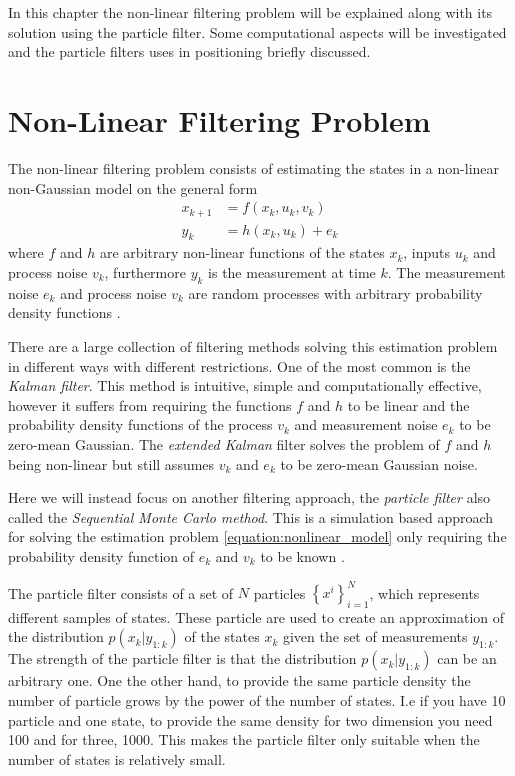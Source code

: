 \documentclass{LTHthesis}
\begin{document}
In this chapter the non-linear filtering problem will be explained along with its solution using the particle filter. Some computational aspects will be investigated and the particle filters uses in positioning briefly discussed.
%
\section{Non-Linear Filtering Problem}
The non-linear filtering problem consists of estimating the states in a non-linear non-Gaussian model on the general form
%
\begin{subequations}
\label{equation:nonlinear_model}
\begin{align}
x_{k+1} &= f(x_k,u_k,v_k) \label{equation:nonlinear_model_first}\\
y_k&=h(x_k,u_k) + e_k
\label{equation:nonlinear_model_second}
\end{align}
\end{subequations} 
%
where $f$ and $h$ are arbitrary non-linear functions of the states $x_k$, inputs $u_k$ and process noise $v_k$, furthermore $y_k$ is the measurement at time $k$. The measurement noise $e_k$ and process noise $v_k$ are random processes with arbitrary probability density functions \cite{gson12}. 

There are a large collection of filtering methods solving this estimation problem in different ways with different restrictions. One of the most common is the \emph{Kalman filter}. This method is intuitive, simple and computationally effective, however it suffers from requiring the functions $f$ and $h$ to be linear and the probability density functions of the process $v_k$ and measurement noise $e_k$ to be zero-mean Gaussian. The \emph{extended Kalman} filter solves the problem of $f$ and $h$ being non-linear but still assumes $v_k$ and $e_k$ to be zero-mean Gaussian noise.

Here we will instead focus on another filtering approach, the \emph{particle filter} also called the \emph{Sequential Monte Carlo method}. This is a simulation based approach for solving the estimation problem \ref{equation:nonlinear_model} only requiring the probability density function of $e_k$ and $v_k$ to be known \cite{gson12,fig_fra10}.  

The particle filter consists of a set of $N$ particles $\left\{x^i\right\}_{i=1}^N$, which represents different samples of states. These particle are used to create an approximation of the distribution $p(x_k|y_{1:k})$  of the states $x_k$ given the set of measurements $y_{1:k}$. The strength of the particle filter is that the distribution $p(x_k|y_{1:k})$ can be an arbitrary one. One the other hand, to provide the same particle density the number of particle grows by the power of the number of states. I.e if you have 10 particle and one state, to provide the same density for two dimension you need 100 and for three, 1000. This makes the particle filter only suitable when the number of states is relatively small.
%
\end{document}
